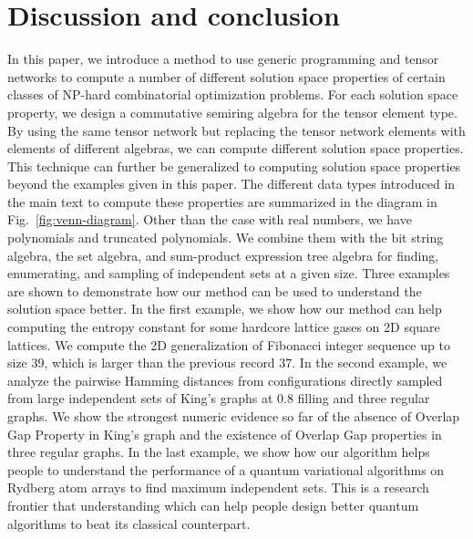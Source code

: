 \documentclass[onefignum, onetabnum]{siamart190516}
\newcommand{\<}{\langle}
\renewcommand{\>}{\rangle}
\newcommand{\Fig}[1]{Fig.~\ref{#1}}
\newcounter{example}
\begin{document}
\section{Discussion and conclusion}
In this paper, we introduce a method to use generic programming and tensor networks to compute a number of different solution space properties of certain classes of NP-hard combinatorial optimization problems. %
For each solution space property, we design a commutative semiring algebra for the tensor element type. By using the same tensor network but replacing the tensor network elements with elements of different algebras, we can compute different solution space properties. This technique can further be generalized to computing solution space properties beyond the examples given in this paper. %
The different data types introduced in the main text to compute these properties are  summarized in the diagram in \Fig{fig:venn-diagram}. %
Other than the case with real numbers, we have polynomials and truncated polynomials.
We combine them with the bit string algebra, the set algebra, and sum-product expression tree algebra for finding, enumerating, and sampling of independent sets at a given size. Three examples are shown to demonstrate how our method can be used to understand the solution space better.
In the first example, we show how our method can help computing the entropy constant for some hardcore lattice gases on 2D square lattices. We compute the 2D generalization of Fibonacci integer sequence up to size $39$, which is larger than the previous record $37$.
In the second example, we analyze the pairwise Hamming distances from configurations directly sampled from large independent sets of King's graphs at $0.8$ filling and three regular graphs. We show the strongest numeric evidence so far of the absence of Overlap Gap Property in King's graph and the existence of Overlap Gap properties in three regular graphs.
In the last example, we show how our algorithm helps people to understand the performance of a quantum variational algorithms on Rydberg atom arrays to find maximum independent sets. This is a research frontier that understanding which can help people design better quantum algorithms to beat its classical counterpart.
\end{document}
